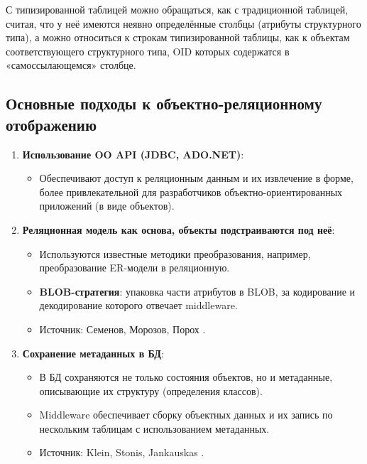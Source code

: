 \documentclass[a4paper,12pt]{article}
\begin{document}
С типизированной таблицей можно обращаться, как с традиционной таблицей, считая, что у неё имеются неявно определённые столбцы (атрибуты структурного типа), а можно относиться к строкам типизированной таблицы, как к объектам соответствующего структурного типа, OID которых содержатся в «самоссылающемся» столбце.

\subsection{Основные подходы к объектно-реляционному отображению}

\begin{enumerate}
    \item \textbf{Использование OO API (JDBC, ADO.NET)}:
    \begin{itemize}
        \item Обеспечивают доступ к реляционным данным и их извлечение в форме, более привлекательной для разработчиков объектно-ориентированных приложений (в виде объектов).
    \end{itemize}
    
    \item \textbf{Реляционная модель как основа, объекты подстраиваются под неё}:
    \begin{itemize}
        \item Используются известные методики преобразования, например, преобразование ER-модели в реляционную.
        \item \textbf{BLOB-стратегия}: упаковка части атрибутов в BLOB, за кодирование и декодирование которого отвечает middleware.
        \item Источник: Семенов, Морозов, Порох \cite{Semenov2004}.
    \end{itemize}
    
    \item \textbf{Сохранение метаданных в БД}:
    \begin{itemize}
        \item В БД сохраняются не только состояния объектов, но и метаданные, описывающие их структуру (определения классов).
        \item Middleware обеспечивает сборку объектных данных и их запись по нескольким таблицам с использованием метаданных.
        \item Источник: Klein, Stonis, Jankauskas \cite{Klein2001}.
    \end{itemize}
\end{enumerate}
\end{document}
